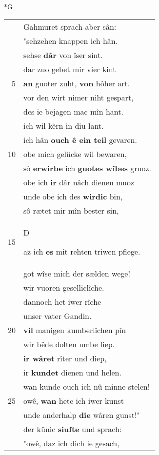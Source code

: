 \documentclass[8pt,a4paper,notitlepage]{article}
\begin{document}
\begin{table}[ht]
\begin{minipage}[t]{0.5\linewidth}
\small
\begin{center}*G
\end{center}
\begin{tabular}{rl}
 & Gahmuret sprach aber sân:\\ 
 & "sehzehen knappen ich hân.\\ 
 & sehse \textbf{dâr} von îser sint.\\ 
 & dar zuo gebet mir vier kint\\ 
5 & \textbf{an} guoter zuht, \textbf{von} hôher art.\\ 
 & vor den wirt nimer niht gespart,\\ 
 & des ie bejagen mac mîn hant.\\ 
 & ich wil kêrn in diu lant.\\ 
 & ich hân \textbf{ouch ê ein teil} gevaren.\\ 
10 & obe mich gelücke wil bewaren,\\ 
 & sô \textbf{erwirbe} ich \textbf{guotes wîbes} gruoz.\\ 
 & obe ich \textbf{ir} dâr nâch dienen muoz\\ 
 & unde obe ich des \textbf{wirdic} bin,\\ 
 & sô rætet mir mîn bester sin,\\ 
15 & \begin{large}D\end{large}az ich \textbf{es} mit rehten triwen pflege.\\ 
 & got wîse mich der sælden wege!\\ 
 & wir vuoren geselliclîche.\\ 
 & dannoch het iwer rîche\\ 
 & unser vater Gandin.\\ 
20 & \textbf{vil} manigen kumberlîchen pîn\\ 
 & wir bêde dolten umbe liep.\\ 
 & \textbf{ir wâret} rîter und diep,\\ 
 & ir \textbf{kundet} dienen und helen.\\ 
 & wan kunde ouch ich nû minne stelen!\\ 
25 & owê, \textbf{wan} hete ich iwer kunst\\ 
 & unde anderhalp \textbf{die} wâren gunst!"\\ 
 & der künic \textbf{siufte} und sprach:\\ 
 & "owê, daz ich dich ie gesach,\\ 

\end{tabular}
\end{minipage}
\end{table}
\end{document}
